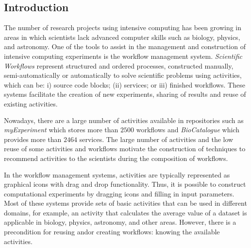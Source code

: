 \documentclass[a0, portrait]{a0poster}
\begin{document}
\begin{multicols}{2} %


\section*{Introduction}

The number of research projects using intensive computing has been growing in areas in which scientists lack advanced computer skills such as biology, physics, and astronomy. One of the tools to assist in the management and construction of intensive computing experiments is the workflow management system. \emph{Scientific Workflows} represent structured and ordered processes, constructed manually, semi-automatically or automatically to solve scientific problems using activities, which can be: i) source code blocks; (ii) services; or iii) finished workflows. These systems facilitate the creation of new experiments, sharing of results and reuse of existing activities.

Nowadays, there are a large number of activities available in repositories such as \emph{myExperiment} which stores more than $2500$ workflows and \emph{BioCatalogue} which provides more than $2464$ services. The large number of activities and the low reuse of some activities and workflows motivate the construction of techniques to recommend activities to the scientists during the composition of workflows.

In the workflow management systems, activities are typically represented as graphical icons with drag and drop functionality. Thus, it is possible to construct computational experiments by dragging icons and filling in input parameters. Most of these systems provide sets of basic activities that can be used in different domains, for example, an activity that calculates the average value of a dataset is applicable in biology, physics, astronomy, and other areas. However, there is a precondition for reusing and\/or creating workflows: knowing the available activities.


\end{multicols}
\end{document}
